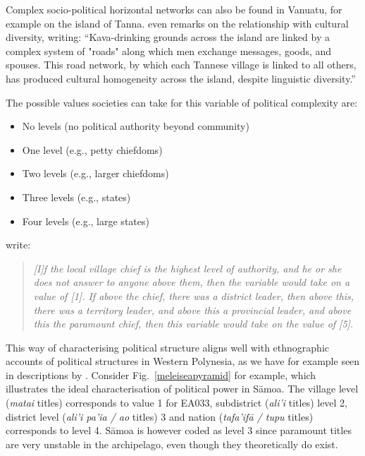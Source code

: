 \documentclass[unnumsec,webpdf,modern,medium]{oup-authoring-template}
\begin{document}
\begin{appendices}
Complex socio-political horizontal networks can also be found in Vanuatu, for example on the island of Tanna. \citet[314]{lindstroem1991} even remarks on the relationship with cultural diversity, writing: ``Kava-drinking grounds across the island are linked by a complex system of "roads" along which men exchange messages, goods, and spouses. This road network, by which each Tannese village is linked to all others, has produced cultural homogeneity across the island, despite linguistic diversity.''


The possible values societies can take for this variable of political complexity are:

\begin{itemize}
\item No levels (no political authority beyond community)
\item One level (e.g., petty chiefdoms)
\item Two levels (e.g., larger chiefdoms)
\item Three levels (e.g., states) 
\item Four levels (e.g., large states)
\end{itemize}

\citet{giuliano2018ancestral} write: 

\begin{quotation}
\noindent\emph{[I]f the local village chief is the highest level of authority, and he or she does not answer to anyone above them, then the variable would take on a value of [1]. If above the chief, there was a district leader, then above this, there was a territory leader, and above this a provincial leader, and above this the paramount chief, then this variable would take on the value of [5].} 
\begin{flushright}
\citet[9]{giuliano2018ancestral}
\end{flushright}
\end{quotation}

This way of characterising political structure aligns well with ethnographic accounts of political structures in Western Polynesia, as we have for example seen in descriptions by \citet{sahlins63}. Consider Fig.~\ref{meleiseapyramid} \citep[22]{meleisea1995} for example, which illustrates the ideal characterisation of political power in S\={a}moa. The village level (\emph{matai} titles) corresponds to value 1 for EA033, subdistrict (\emph{ali'i} titles) level 2, district level (\emph{ali'i pa'ia / ao} titles) 3 and nation (\emph{tafa'if\={a} / tupu} titles) corresponds to level 4. S\={a}moa is however coded as level 3 since paramount titles are very unstable in the archipelago, even though they theoretically do exist.


\end{appendices}
\end{document}
